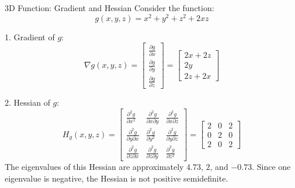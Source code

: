 \begin{example}{3D Function: Gradient and Hessian}{}
Consider the function:
\[ g(x, y, z) = x^2 + y^2 + z^2 + 2xz \]

1. Gradient of \( g \):
\[
\nabla g(x, y, z) = \begin{bmatrix}
\frac{\partial g}{\partial x} \\
\frac{\partial g}{\partial y} \\
\frac{\partial g}{\partial z}
\end{bmatrix}
= \begin{bmatrix}
2x + 2z \\
2y \\
2z + 2x
\end{bmatrix}
\]

2. Hessian of \( g \):
\[
H_g(x, y, z) = \begin{bmatrix}
\frac{\partial^2 g}{\partial x^2} & \frac{\partial^2 g}{\partial x \partial y} & \frac{\partial^2 g}{\partial x \partial z} \\
\frac{\partial^2 g}{\partial y \partial x} & \frac{\partial^2 g}{\partial y^2} & \frac{\partial^2 g}{\partial y \partial z} \\
\frac{\partial^2 g}{\partial z \partial x} & \frac{\partial^2 g}{\partial z \partial y} & \frac{\partial^2 g}{\partial z^2}
\end{bmatrix}
= \begin{bmatrix}
2 & 0 & 2 \\
0 & 2 & 0 \\
2 & 0 & 2
\end{bmatrix}
\]
The eigenvalues of this Hessian are approximately \( 4.73 \), \( 2 \), and \( -0.73 \). Since one eigenvalue is negative, the Hessian is not positive semidefinite.
\end{example}






